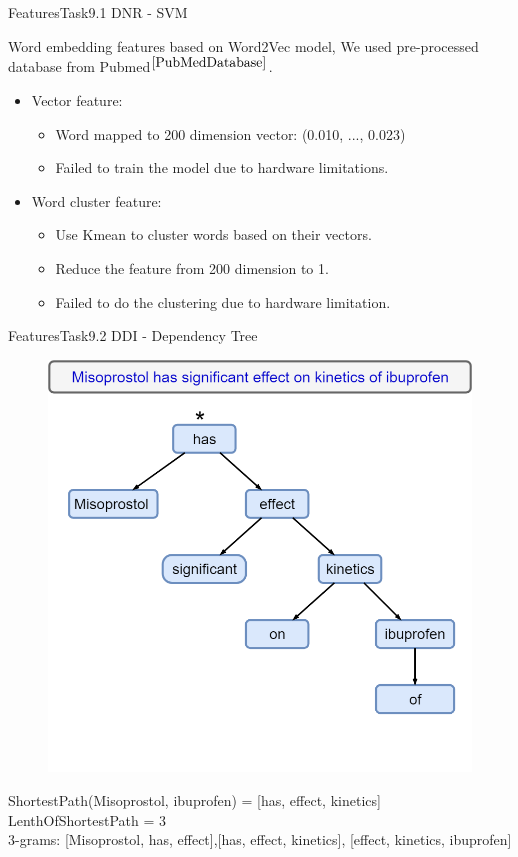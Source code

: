 \documentclass[xcolor=table]{beamer}
\begin{document}
\begin{frame}{Features}{Task9.1 DNR - SVM}

Word embedding features based on Word2Vec model, We used pre-processed database from Pubmed$^{\cite{PubMedDatabase}}$.

\begin{itemize}
    \item Vector feature:
    \begin{itemize}
        \item  Word mapped to 200 dimension vector: (0.010, ..., 0.023)
        \item Failed to train the model due to hardware limitations.
    \end{itemize}
    \item Word cluster feature:
    \begin{itemize}
        \item Use Kmean to cluster words based on their vectors.
        \item Reduce the feature from 200 dimension to 1.
        \item Failed to do the clustering due to hardware limitation.
    \end{itemize}
\end{itemize}
\end{frame}



\begin{frame}{Features}{Task9.2 DDI - Dependency Tree}
\begin{figure}
\includegraphics[scale=0.2]{tree.png}
\end{figure}
\vspace*{-35pt}
\small{ShortestPath(Misoprostol, ibuprofen) = [has, effect, kinetics]\\
LenthOfShortestPath = 3\\
3-grams: [Misoprostol, has, effect],[has, effect, kinetics], [effect, kinetics, ibuprofen]}
\end{frame}
\end{document}
